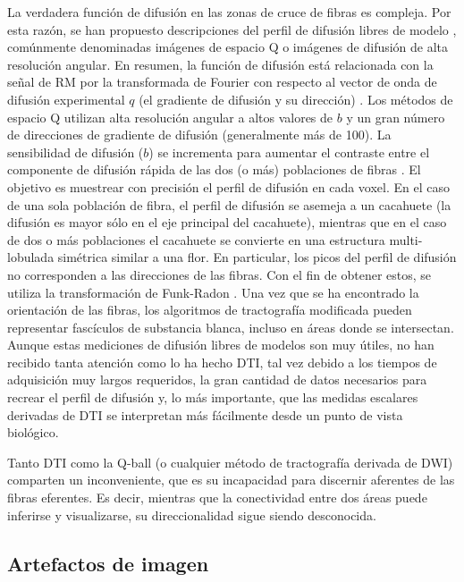 La verdadera función de difusión en las zonas de cruce de fibras es compleja. Por esta razón, se han propuesto  descripciones  del perfil de difusión libres de modelo \cite{Alexander_2002,Tuch_2004}, comúnmente denominadas imágenes de espacio Q o imágenes de difusión de alta resolución angular. En resumen, la función de difusión está relacionada con la señal de RM por la transformada de Fourier con respecto al vector de onda de difusión experimental $q$ (el gradiente de difusión y su dirección) \cite{Stejskal_1965, Tuch_2004}. Los métodos de espacio Q utilizan alta resolución angular a altos valores de $b$ y un gran número de direcciones de gradiente de difusión (generalmente más de 100). La sensibilidad de difusión ($b$) se incrementa para aumentar el contraste entre el componente de difusión rápida de las dos (o más) poblaciones de fibras \cite{Tuch_2003}. El objetivo es muestrear con precisión el perfil de difusión en cada voxel. En el caso de una sola población de fibra, el perfil de difusión se asemeja a un cacahuete (la difusión es mayor sólo en el eje principal del cacahuete), mientras que en el caso de dos o más poblaciones el cacahuete se convierte en una estructura multi-lobulada simétrica similar a una flor. En particular, los picos del perfil de difusión no corresponden a las direcciones de las fibras. Con el fin de obtener estos, se utiliza  la transformación de Funk-Radon \cite{Tuch_2004}. Una vez que se ha encontrado la orientación de las fibras, los algoritmos de tractografía modificada pueden representar fascículos de substancia blanca, incluso en áreas donde se intersectan. Aunque estas mediciones de difusión libres de modelos son muy útiles, no han recibido tanta atención como lo ha hecho DTI, tal vez debido a los tiempos de adquisición muy largos requeridos, la gran cantidad de datos necesarios para recrear el perfil de difusión y, lo más importante, que las medidas escalares derivadas de DTI se interpretan más fácilmente desde un punto de vista biológico. 

Tanto DTI como la Q-ball (o cualquier método de tractografía derivada de DWI) comparten un inconveniente, que es su incapacidad para discernir aferentes de las fibras eferentes. Es decir, mientras que la conectividad entre dos áreas puede inferirse y visualizarse, su direccionalidad sigue siendo desconocida.

\subsection{Artefactos de imagen}
\label{sec:ArtefactosDWI}

